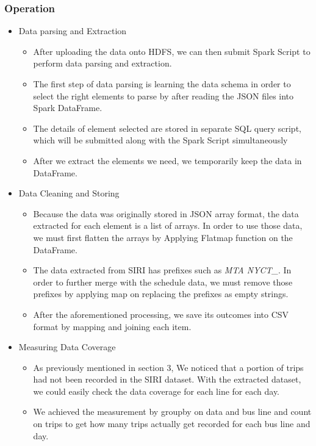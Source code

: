 \documentclass[12pt,journal,compsoc]{IEEEtran}
\begin{document}
\subsubsection*{Operation}
\begin{itemize}
\item Data parsing and Extraction
\begin{itemize}
\item After uploading the data onto HDFS, we can then submit Spark Script to perform data parsing and extraction.
\item The first step of data parsing is learning the data schema in order to select the right elements to parse by after  reading the JSON files into Spark DataFrame.
\item The details of element selected are stored in separate SQL query script, which will be submitted along with the Spark Script simultaneously
\item After we extract the elements we need, we temporarily keep the data in DataFrame.
\end{itemize}


\item Data Cleaning and Storing

\begin{itemize}

\item Because the data was originally stored in JSON array format, the data extracted for each element is a list of arrays. In order to use those data, we must first flatten the arrays by Applying Flatmap function on the DataFrame.
\item The data extracted from SIRI has prefixes such as \textit{MTA NYCT\_}. In order to further merge with the schedule data, we must remove those prefixes by applying map on replacing the prefixes as empty strings.
\item After the aforementioned processing, we save its outcomes into CSV format by mapping and joining each item.

\end{itemize}


 
\item Measuring Data Coverage
\begin{itemize}
\item As previously mentioned in section 3, We noticed that a portion of trips had not been recorded in the SIRI dataset. With the extracted dataset, we could easily check the data coverage for each line for each day.
\item We achieved the measurement by groupby on data and bus line and count on trips to get how many trips actually get recorded for each bus line and day. 
\end{itemize}



\end{itemize}
\end{document}
